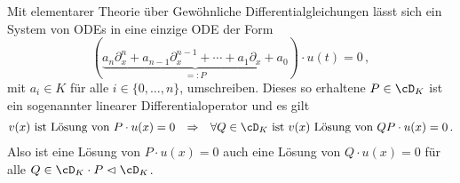 \begin{comment}
$1=TT^{-1}$ $\rightsquigarrow$ $T'T^{-1}+T(T^{-1})'=0$\\
$1=T^{-1}T$ $\rightsquigarrow$ $(T^{-1})'T+T^{-1}T'=0$
\end{comment}

Mit elementarer Theorie über Gewöhnliche Differentialgleichungen lässt sich
ein System von ODEs in eine einzige ODE der Form
\begin{equation} \label{eq:UmgeformteODE}
(\underset{=:P}{\underbrace{ a_n\partial_x^n + a_{n-1}\partial_x^{n-1} +
  \cdots + a_1\partial_x + a_0}})\cdot u(t)=0 \,,
\end{equation}
mit $a_i\in K$ für alle $i\in\{0,\dots,n\}$, umschreiben. Dieses so erhaltene
$P\in\cD_K$ ist ein sogenannter linearer Differentialoperator und es gilt
\begin{align*}
v(x) \text{ ist Lösung von } P\cdot u(x)=0
&&\Rightarrow && \forall Q\in \cD_K \text{ ist } v(x) \text{ Lösung von }
QP\cdot u(x)=0 \,.
\end{align*}
Also ist eine Lösung von $P\cdot u(x)=0$ auch eine Lösung von $Q\cdot u(x)=0$
für alle $Q\in\cD_K\cdot P\vartriangleleft \cD_K$.

\begin{comment}
Sei $P$ ein linearer Differentialoperator mit Koeffizienten in $a_i(x)\in\Ckx$
geschrieben als $P=\sum^{d}_{i=0}{a_{i}(x)\partial_x^i}$.
Man sagt eine Funktion $u\in\cF$ ist Lösung von $P$, falls $u$ die Gleichung
$Pu=0$ erfüllt.
Man sagt $0$ ist ein singulärer Punkt falls $a_d(0)=0$.
Falls $0$ kein singulärer Punkt ist, hat $P$ genau $d$ über $\C$ Unabhängige
Lösungen in $\Ckx$. %
\end{comment}

